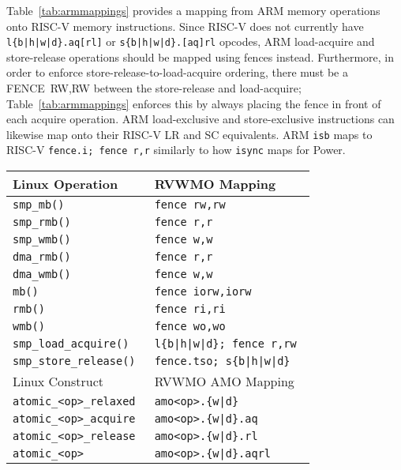 Table~\ref{tab:armmappings} provides a mapping from ARM memory operations onto RISC-V memory instructions.
Since RISC-V does not currently have {\tt l\{b|h|w|d\}.aq[rl]} or  {\tt s\{b|h|w|d\}.[aq]rl} opcodes, ARM load-acquire and store-release operations should be mapped using fences instead.
Furthermore, in order to enforce store-release-to-load-acquire ordering, there must be a FENCE~RW,RW between the store-release and load-acquire; Table~\ref{tab:armmappings} enforces this by always placing the fence in front of each acquire operation.
ARM load-exclusive and store-exclusive instructions can likewise map onto their RISC-V LR and SC equivalents.
ARM {\tt isb} maps to RISC-V {\tt fence.i;~fence~r,r} similarly to how {\tt isync} maps for Power.

\begin{table}[h!]
  \centering
  \begin{tabular}{|l|l|}
    \hline
    Linux Operation           & RVWMO Mapping \\
    \hline
    \hline
    \tt smp\_mb()             & \tt fence rw,rw \\
    \hline
    \tt smp\_rmb()            & \tt fence r,r \\
    \hline
    \tt smp\_wmb()            & \tt fence w,w \\
    \hline
    \tt dma\_rmb()            & \tt fence r,r \\
    \hline
    \tt dma\_wmb()            & \tt fence w,w \\
    \hline
    \tt mb()                  & \tt fence iorw,iorw \\
    \hline
    \tt rmb()                 & \tt fence ri,ri \\
    \hline
    \tt wmb()                 & \tt fence wo,wo \\
    \hline
    \tt smp\_load\_acquire()   & \tt l\{b|h|w|d\}; fence r,rw \\
    \hline
    \tt smp\_store\_release()  & \tt fence.tso; s\{b|h|w|d\}  \\
    \hline
    \hline
    Linux Construct            & RVWMO AMO Mapping        \\
    \hline
    \tt atomic\_<op>\_relaxed  & \tt amo<op>.\{w|d\}      \\
    \hline
    \tt atomic\_<op>\_acquire  & \tt amo<op>.\{w|d\}.aq   \\
    \hline
    \tt atomic\_<op>\_release  & \tt amo<op>.\{w|d\}.rl   \\
    \hline
    \tt atomic\_<op>           & \tt amo<op>.\{w|d\}.aqrl \\

\end{tabular}
\end{table}
